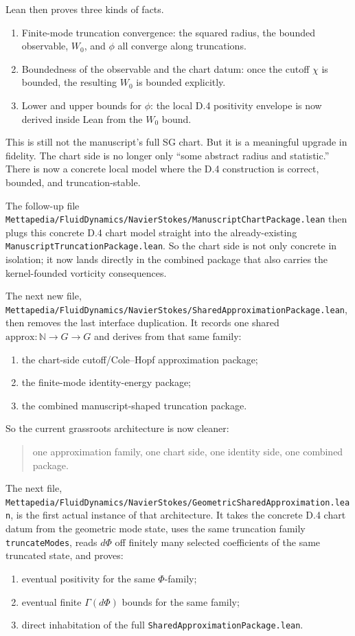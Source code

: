 \documentclass[11pt]{article}
\theoremstyle{remark}
\begin{document}
Lean then proves three kinds of facts.
\begin{enumerate}[leftmargin=1.5em]
  \item Finite-mode truncation convergence: the squared radius, the bounded
  observable, \(W_0\), and \(\phi\) all converge along truncations.
  \item Boundedness of the observable and the chart datum: once the cutoff
  \(\chi\) is bounded, the resulting \(W_0\) is bounded explicitly.
  \item Lower and upper bounds for \(\phi\): the local D.4 positivity envelope
  is now derived inside Lean from the \(W_0\) bound.
\end{enumerate}

This is still not the manuscript's full SG chart.  But it is a meaningful
upgrade in fidelity.  The chart side is no longer only ``some abstract radius
and statistic.''  There is now a concrete local model where the D.4
construction is correct, bounded, and truncation-stable.

The follow-up file
\texttt{Mettapedia/FluidDynamics/NavierStokes/ManuscriptChartPackage.lean}
then plugs this concrete D.4 chart model straight into the already-existing
\texttt{ManuscriptTruncationPackage.lean}.  So the chart side is not only
concrete in isolation; it now lands directly in the combined package that also
carries the kernel-founded vorticity consequences.

The next new file,
\texttt{Mettapedia/FluidDynamics/NavierStokes/SharedApproximationPackage.lean},
then removes the last interface duplication.  It records one shared
\(\mathrm{approx} : \mathbb{N} \to G \to G\) and derives from that same family:
\begin{enumerate}[leftmargin=1.5em]
  \item the chart-side cutoff/Cole--Hopf approximation package;
  \item the finite-mode identity-energy package;
  \item the combined manuscript-shaped truncation package.
\end{enumerate}

So the current grassroots architecture is now cleaner:
\begin{quote}
one approximation family, one chart side, one identity side, one combined
package.
\end{quote}

The next file,
\texttt{Mettapedia/FluidDynamics/NavierStokes/GeometricSharedApproximation.lean},
is the first actual instance of that architecture.  It takes the concrete D.4
chart datum from the geometric mode state, uses the same truncation family
\texttt{truncateModes}, reads \(d\Phi\) off finitely many selected coefficients
of the same truncated state, and proves:
\begin{enumerate}[leftmargin=1.5em]
  \item eventual positivity for the same \(\Phi\)-family;
  \item eventual finite \(\Gamma(d\Phi)\) bounds for the same family;
  \item direct inhabitation of the full
  \texttt{SharedApproximationPackage.lean}.
\end{enumerate}
\end{document}
